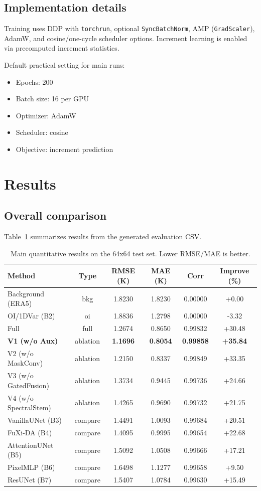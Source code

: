 \documentclass[preprint,12pt]{elsarticle}
\begin{document}
\subsection{Implementation details}
Training uses DDP with \texttt{torchrun}, optional \texttt{SyncBatchNorm}, AMP (\texttt{GradScaler}), AdamW, and cosine/one-cycle scheduler options. Increment learning is enabled via precomputed increment statistics.

Default practical setting for main runs:
\begin{itemize}[leftmargin=*]
\item Epochs: 200
\item Batch size: 16 per GPU
\item Optimizer: AdamW
\item Scheduler: cosine
\item Objective: increment prediction
\end{itemize}

\section{Results}
\subsection{Overall comparison}
Table~\ref{tab:main} summarizes results from the generated evaluation CSV.

\begin{table}[H]
\centering
\caption{Main quantitative results on the 64x64 test set. Lower RMSE/MAE is better.}
\label{tab:main}
\begin{tabular}{lccccc}
\toprule
Method & Type & RMSE (K) & MAE (K) & Corr & Improve (\%) \\
\midrule
Background (ERA5) & bkg & 1.8230 & 1.8230 & 0.00000 & +0.00 \\
OI/1DVar (B2) & oi & 1.8836 & 1.2798 & 0.00000 & -3.32 \\
Full & full & 1.2674 & 0.8650 & 0.99832 & +30.48 \\
\textbf{V1 (w/o Aux)} & ablation & \textbf{1.1696} & \textbf{0.8054} & \textbf{0.99858} & \textbf{+35.84} \\
V2 (w/o MaskConv) & ablation & 1.2150 & 0.8337 & 0.99849 & +33.35 \\
V3 (w/o GatedFusion) & ablation & 1.3734 & 0.9445 & 0.99736 & +24.66 \\
V4 (w/o SpectralStem) & ablation & 1.4265 & 0.9690 & 0.99732 & +21.75 \\
VanillaUNet (B3) & compare & 1.4491 & 1.0093 & 0.99684 & +20.51 \\
FuXi-DA (B4) & compare & 1.4095 & 0.9995 & 0.99654 & +22.68 \\
AttentionUNet (B5) & compare & 1.5092 & 1.0508 & 0.99666 & +17.21 \\
PixelMLP (B6) & compare & 1.6498 & 1.1277 & 0.99658 & +9.50 \\
ResUNet (B7) & compare & 1.5407 & 1.0784 & 0.99630 & +15.49 \\
\bottomrule
\end{tabular}
\end{table}
\end{document}
